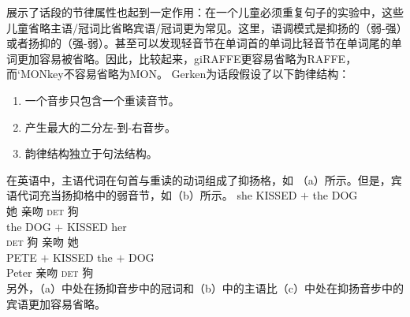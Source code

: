  \citet{Gerken91a}展示了话段的节律属性也起到一定作用：在一个儿童必须重复句子的实验中，这些儿童省略主语/冠词比省略宾语/冠词更为常见。这里，语调模式是抑扬的（弱-强）或者扬抑的（强-弱）。甚至可以发现轻音节在单词首的单词比轻音节在单词尾的单词更加容易被省略。因此，比较起来，giRAFFE更容易省略为RAFFE，而`MONkey不容易省略为MON。 Gerken为话段假设了以下韵律结构：
\begin{enumerate}
\item 一个音步只包含一个重读音节。
\item 产生最大的二分左-到-右音步。
\item 韵律结构独立于句法结构。
\end{enumerate}
在英语中，主语代词在句首与重读的动词组成了抑扬格，如 （a）所示。但是，宾语代词充当扬抑格中的弱音节，如（b）所示。
\eal
\ex 
\gll she KISSED $+$ the DOG\\  
     她 亲吻 {} \textsc{det} 狗\\
\ex 
\gll the DOG $+$ KISSED her\\  
    \textsc{det} 狗 {} 亲吻 她\\
\ex 
\gll PETE $+$ KISSED the $+$ DOG\\  
    Peter {} 亲吻 \textsc{det} {} 狗\\
\zl
另外，（a）中处在扬抑音步中的冠词和（b）中的主语比（c）中处在抑扬音步中的宾语更加容易省略。


